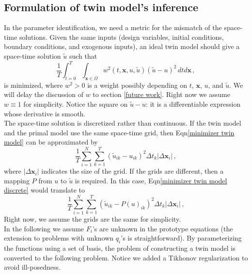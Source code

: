 \documentclass[a4paper,onecolumn]{article}
\theoremstyle{remark}
\begin{document}
\subsection{Formulation of twin model's inference}
\label{general formulation}
\noindent In the parameter identification,
we need a metric for the mismatch of the space-time solutions.
Given the same inputs (design variables, initial conditions, boundary conditions, and exogenous 
inputs), an ideal twin model should give a space-time solution $\tilde{u}$ such that
\begin{equation}
    \frac{1}{T}
    \int_{t=0}^T\int_{\mathbf{x}\in\Omega} w^2(t,\mathbf{x}, u,\tilde{u}) (\tilde{u} - 
    u)^2 \, dtd\mathbf{x}\,,
    \label{minimizer twin model}
\end{equation}
is minimized,
where $w^2>0$ is a weight possibly depending on $t$, $\mathbf{x}$, $u$, and $\tilde{u}$.
We will delay the discussion of $w$ to section \ref{future work}.
Right now we assume $w\equiv 1$ for simplicity.
Notice the square on $\tilde{u}-u$: it is a differentiable expression
whose derivative is smooth.\\

\noindent The space-time solution is discretized rather than continuous. 
If the twin model and the 
primal model use the same space-time grid, then Eqn\eqref{minimizer twin model} can be
approximated by
\begin{equation}
    \frac{1}{T}
    \sum_{i=1}^{N}\sum_{k=1}^{T} \left(\tilde{u}_{ik} - u_{ik}\right)^2 \Delta t_k
    \left| \Delta \mathbf{x}_i \right|\,,
    \label{minimizer twin model discrete}
\end{equation}
where $\left| \Delta \mathbf{x}_i \right|$ indicates the size of the grid.
If the grids are different, then a mapping $P$ from $u$ to $\tilde{u}$ is required.
In this case, Eqn\eqref{minimizer twin model discrete} would translate to
\begin{equation}
    \frac{1}{T}
    \sum_{i=1}^{N}\sum_{k=1}^{T} \left(\tilde{u}_{ik} - P(u)_{ik}\right)^2 \Delta t_k
    \left| \Delta \mathbf{x}_i \right|\,,
    \label{minimizer twin model discrete mapping}
\end{equation}
Right now, we assume the grids are the same for simplicity.\\

\noindent 
In the following we assume $F_i$'s are unknown in the prototype equations
(the extension to problems with unknown $q_i$'s
is straightforward). By parameterizing the functions using a set of basis,
the problem of constructing a twin model
is converted to the following problem. Notice we added a Tikhonov regularization
to avoid ill-posedness. \\
\end{document}
